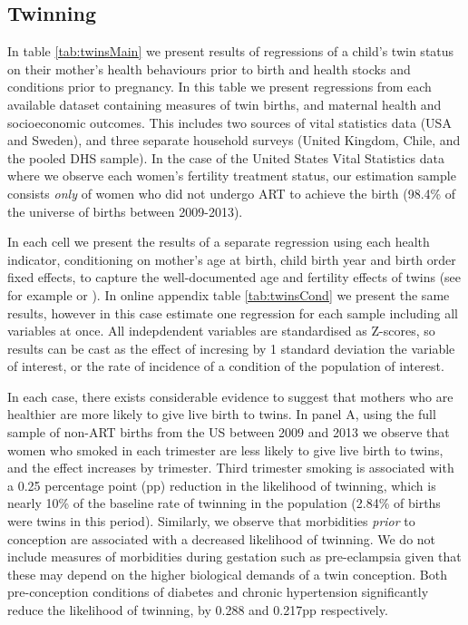 \documentclass[subeqn]{article}
\begin{document}
\begin{spacing}{1.4}
\subsection{Twinning}                              \label{TWINsscn:twinning}
In table \ref{tab:twinsMain} we present results of regressions of a child's
twin status on their mother's health behaviours prior to birth and health
stocks and conditions prior to pregnancy.  In this table we present regressions
from each available dataset containing measures of twin births, and maternal
health and socioeconomic outcomes.  This includes two sources of vital
statistics data (USA and Sweden), and three separate household surveys (United
Kingdom, Chile, and the pooled DHS sample).  In the case of the United States
Vital Statistics data where we observe each women's fertility treatment status,
our estimation sample consists \emph{only} of women who did not undergo ART to
achieve the birth (98.4\% of the universe of births between 2009-2013).

In each cell we present the results of a separate regression using each health
indicator, conditioning on mother's age at birth, child birth year and birth
order fixed effects, to capture the well-documented age and fertility effects
of twins (see for example \citet{Hall2003} or \citet{RosenzweigWolpin1980}). In
online appendix table \ref{tab:twinsCond} we present the same results, however
in this case estimate one regression for each sample including all variables at
once. All indepdendent variables are standardised as Z-scores, so results can
be cast as the effect of incresing by 1 standard deviation the variable of
interest, or the rate of incidence of a condition of the population of interest.

In each case, there exists considerable evidence to suggest that mothers who
are healthier are more likely to give live birth to twins.  In panel A, using
the full sample of non-ART births from the US between 2009 and 2013 we observe
that women who smoked in each trimester are less likely to give live birth to
twins, and the effect increases by trimester.  Third trimester smoking is
associated with a 0.25 percentage point (pp) reduction in the likelihood of
twinning, which is nearly 10\% of the baseline rate of twinning in the
population (2.84\% of births were twins in this period).  Similarly, we observe
that morbidities \emph{prior} to conception are associated with a decreased
likelihood of twinning.  We do not include measures of morbidities during
gestation such as pre-eclampsia given that these may depend on the higher
biological demands of a twin conception.  Both pre-conception conditions of
diabetes and chronic hypertension significantly reduce the likelihood of
twinning, by 0.288 and 0.217pp respectively. 


\end{spacing}
\end{document}
